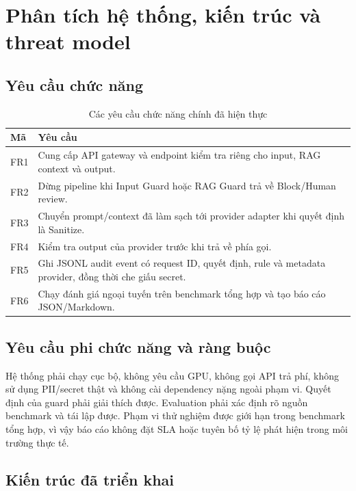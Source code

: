 \chapter{Phân tích hệ thống, kiến trúc và threat model}
\label{chap:system-analysis}

\section{Yêu cầu chức năng}

\begin{table}[H]
\centering
\caption{Các yêu cầu chức năng chính đã hiện thực}
\label{tab:functional-req-final}
\begin{tabularx}{\textwidth}{p{1.3cm}X}
\toprule
Mã & Yêu cầu \\
\midrule
FR1 & Cung cấp API gateway và endpoint kiểm tra riêng cho input, RAG context và output. \\
FR2 & Dừng pipeline khi Input Guard hoặc RAG Guard trả về Block/Human review. \\
FR3 & Chuyển prompt/context đã làm sạch tới provider adapter khi quyết định là Sanitize. \\
FR4 & Kiểm tra output của provider trước khi trả về phía gọi. \\
FR5 & Ghi JSONL audit event có request ID, quyết định, rule và metadata provider, đồng thời che giấu secret. \\
FR6 & Chạy đánh giá ngoại tuyến trên benchmark tổng hợp và tạo báo cáo JSON/Markdown. \\
\bottomrule
\end{tabularx}
\end{table}

\section{Yêu cầu phi chức năng và ràng buộc}

Hệ thống phải chạy cục bộ, không yêu cầu GPU, không gọi API trả phí, không sử
dụng PII/secret thật và không cài dependency nặng ngoài phạm vi. Quyết định của
guard phải giải thích được. Evaluation phải xác định rõ nguồn benchmark và tái
lập được. Phạm vi thử nghiệm được giới hạn trong benchmark tổng hợp, vì vậy báo
cáo không đặt SLA hoặc tuyên bố tỷ lệ phát hiện trong môi trường thực tế.

\section{Kiến trúc đã triển khai}

